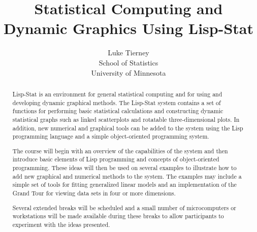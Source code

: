 \setlength{\parskip}{4mm}


\title{Statistical Computing and Dynamic Graphics Using Lisp-Stat}
\author{Luke Tierney\\School of Statistics\\University of Minnesota}



\maketitle

\begin{abstract}
Lisp-Stat is an environment for general statistical computing and for
using and developing dynamic graphical methods. The Lisp-Stat system
contains a set of functions for performing basic statistical
calculations and constructing dynamic statistical graphs such as
linked scatterplots and rotatable three-dimensional plots. In
addition, new numerical and graphical tools can be added to the system
using the Lisp programming language and a simple object-oriented
programming system.

The course will begin with an overview of the capabilities of the
system and then introduce basic elements of Lisp programming and
concepts of object-oriented programming. These ideas will then be used
on several examples to illustrate how to add new graphical and
numerical methods to the system. The examples may include a simple set
of tools for fitting generalized linear models and an implementation
of the Grand Tour for viewing data sets in four or more dimensions.

Several extended breaks will be scheduled and a small number of
microcomputers or workstations will be made available during these
breaks to allow participants to experiment with the ideas presented.
\end{abstract}

\LARGE









